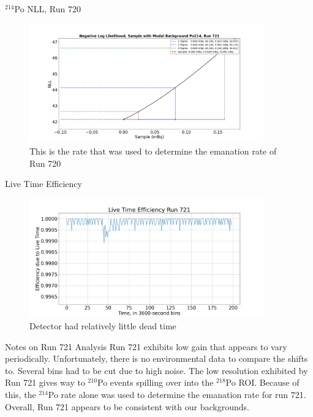 \documentclass[aspectratio=169]{beamer}
\begin{document}
\begin{frame}{$^{214}$Po NLL, Run 720}
    \begin{figure}
        \begin{center}
            \includegraphics[width=0.9\textwidth]
            {assets/720/NLL214.png}
            \caption{This is the rate that was used to determine the emanation rate of Run 720}
        \end{center}
    \end{figure}
\end{frame}

\begin{frame}{Live Time Efficiency}
    \begin{figure}
        \begin{center}
            \includegraphics[width=0.9\textwidth]
            {assets/720/LTE.png}
            \caption{Detector had relatively little dead time}
        \end{center}
    \end{figure}
\end{frame}

\begin{frame}{Notes on Run 721 Analysis}
    Run 721 exhibits low gain that appears to vary periodically.
    Unfortunately, there is no environmental data to compare the shifts to.
    Several bins had to be cut due to high noise.
    The low resolution exhibited by Run 721 gives way to $^{210}$Po events spilling over
    into the $^{218}$Po ROI.
    Because of this, the $^{214}$Po rate alone was used to determine the emanation rate
    for run 721.
    Overall, Run 721 appears to be consistent with our backgrounds.

    \hyperlink{RvT_721}{}
\end{frame}
\end{document}
